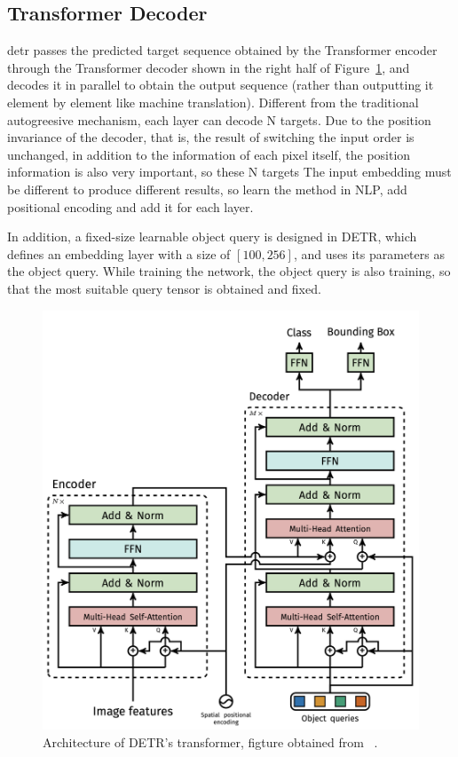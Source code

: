 \subsection{Transformer Decoder}

detr passes the predicted target sequence obtained by the Transformer encoder through the Transformer decoder shown in the right half of Figure~\ref{fig:detrtr}, and decodes it in parallel to obtain the output sequence (rather than outputting it element by element like machine translation). Different from the traditional autogreesive mechanism, each layer can decode N targets. Due to the position invariance of the decoder, that is, the result of switching the input order is unchanged, in addition to the information of each pixel itself, the position information is also very important, so these N targets The input embedding must be different to produce different results, so learn the method in NLP, add positional encoding and add it for each layer.

In addition, a fixed-size learnable object query is designed in DETR, which defines an embedding layer with a size of $ [100, 256] $, and uses its parameters as the object query. While training the network, the object query is also training, so that the most suitable query tensor is obtained and fixed.

\begin{figure}
	\centering
	\includegraphics[width=0.7\linewidth]{figures/detr_tr}
	\caption[Architecture of DETR's transformer]{Architecture of DETR's transformer, figture obtained from ~\cite{carion2020end}.}
	\label{fig:detrtr}
\end{figure}


